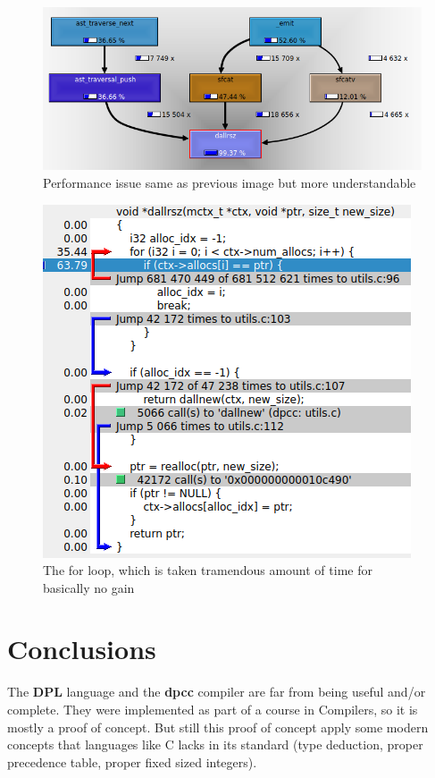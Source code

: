 \documentclass[a4paper]{article}
\begin{document}
\begin{figure}[H]
    \centering
    \includegraphics[scale=0.85]{imgs/dallrsz_callgraph.png}
    \caption{Performance issue same as previous image but more understandable}
\end{figure}


\begin{figure}[H]
    \centering
    \includegraphics{imgs/dallrsz_code_usage.png}
    \caption{The for loop, which is taken tramendous amount of time for basically no gain}
\end{figure}



\section{Conclusions}

The \textbf{DPL} language and the \textbf{dpcc} compiler are far from being useful and/or complete.
They were implemented as part of a course in Compilers, so it is mostly a proof of concept. But still
this proof of concept apply some modern concepts that languages like C lacks in its standard (type deduction, proper precedence table, proper fixed sized integers).
\end{document}
